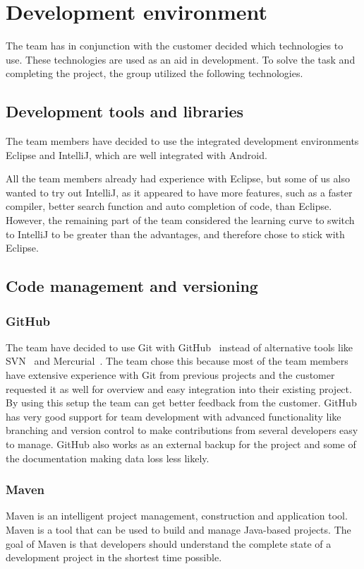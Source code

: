 \chapter{Development environment}

The team has in conjunction with the customer decided which technologies to use. These technologies are used as an aid in development. To solve the task and completing the project, the group utilized the following technologies.

\section{Development tools and libraries}

The team members have decided to use the integrated development environments Eclipse and IntelliJ, which are well integrated with Android. 

All the team members already had experience with Eclipse, but some of us also wanted to try out IntelliJ, as it appeared to have more features, such as a faster compiler, better search function and auto completion of code, than Eclipse. However, the remaining part of the team considered the learning curve to switch to IntelliJ to be greater than the advantages, and therefore chose to stick with Eclipse.

\section{Code management and versioning}
\subsection{GitHub}
The team have decided to use Git with GitHub~\cite{github} instead of alternative tools like SVN~\cite{svn} and Mercurial~\cite{mercurial}. 
The team chose this because most of the team members have extensive experience with Git from previous projects 
and the customer requested it as well for overview and easy integration into their existing project. By using 
this setup the team can get better feedback from the customer. GitHub has very good support for team development 
with advanced functionality like branching and version control to make contributions from several developers easy 
to manage. GitHub also works as an external backup for the project and some of the documentation making data loss less 
likely.

\subsection{Maven}
Maven is an intelligent project management, construction and application tool. Maven is a tool that can be used to build and manage Java-based projects. The goal of Maven is that developers should understand the complete state of a development project in the shortest time possible.

